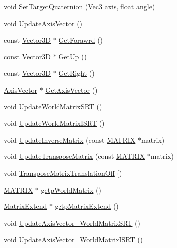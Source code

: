 \begin{DoxyCompactItemize}
\item 
void \mbox{\hyperlink{class_transform_ac8cdb5ca9995d9c124f1890d84c92ab4}{Set\+Target\+Quaternion}} (\mbox{\hyperlink{_vector3_d_8h_ab16f59e4393f29a01ec8b9bbbabbe65d}{Vec3}} axis, float angle)
\item 
void \mbox{\hyperlink{class_transform_afe5350bb1558256115e14c0669611acd}{Update\+Axis\+Vector}} ()
\item 
const \mbox{\hyperlink{class_vector3_d}{Vector3D}} $\ast$ \mbox{\hyperlink{class_transform_a25e4832e15334d74ff847f0ff0b3564f}{Get\+Forawrd}} ()
\item 
const \mbox{\hyperlink{class_vector3_d}{Vector3D}} $\ast$ \mbox{\hyperlink{class_transform_a9f5700481ae42556f763726947feaf36}{Get\+Up}} ()
\item 
const \mbox{\hyperlink{class_vector3_d}{Vector3D}} $\ast$ \mbox{\hyperlink{class_transform_a57d1da919d8df7d2452149c4bbade4d2}{Get\+Right}} ()
\item 
\mbox{\hyperlink{class_axis_vector}{Axis\+Vector}} $\ast$ \mbox{\hyperlink{class_transform_ad300be34dddc6109ca142452e65aa77d}{Get\+Axis\+Vector}} ()
\item 
void \mbox{\hyperlink{class_transform_af1a2dcb4a9d37dd71c203ec248535887}{Update\+World\+Matrix\+S\+RT}} ()
\item 
void \mbox{\hyperlink{class_transform_a3d56e19fba7f44d5f938d62481846fbc}{Update\+World\+Matrix\+I\+S\+RT}} ()
\item 
void \mbox{\hyperlink{class_transform_a3d2e5da24fb1c8015f5bb9a6c0a7a7de}{Update\+Inverse\+Matrix}} (const \mbox{\hyperlink{_vector3_d_8h_a032295cd9fb1b711757c90667278e744}{M\+A\+T\+R\+IX}} $\ast$matrix)
\item 
void \mbox{\hyperlink{class_transform_a486ae5501b5081b22ee053f787e0e4a2}{Update\+Transpose\+Matrix}} (const \mbox{\hyperlink{_vector3_d_8h_a032295cd9fb1b711757c90667278e744}{M\+A\+T\+R\+IX}} $\ast$matrix)
\item 
void \mbox{\hyperlink{class_transform_a053037b225e6fb11e680cc60df15dd45}{Transpose\+Matrix\+Translation\+Off}} ()
\item 
\mbox{\hyperlink{_vector3_d_8h_a032295cd9fb1b711757c90667278e744}{M\+A\+T\+R\+IX}} $\ast$ \mbox{\hyperlink{class_transform_a19538fe991e76eb8146295e6f5f1ed99}{getp\+World\+Matrix}} ()
\item 
\mbox{\hyperlink{class_matrix_extend}{Matrix\+Extend}} $\ast$ \mbox{\hyperlink{class_transform_ac5a4f96871b6c1bfde9b2a6b7b0d6953}{getp\+Matrix\+Extend}} ()
\item 
void \mbox{\hyperlink{class_transform_af02515be1947506212ca1c23223ce0b3}{Update\+Axis\+Vector\+\_\+\+World\+Matrix\+S\+RT}} ()
\item 
void \mbox{\hyperlink{class_transform_a73a20f2b8baad21ba74a2b1c6d8a1ab2}{Update\+Axis\+Vector\+\_\+\+World\+Matrix\+I\+S\+RT}} ()
\end{DoxyCompactItemize}
